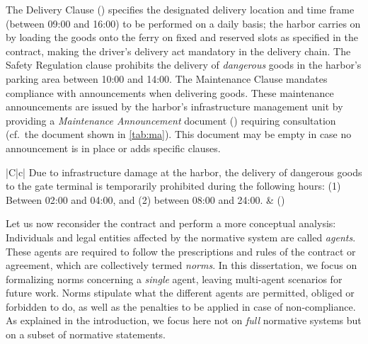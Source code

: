 The Delivery Clause (\DC) specifies the designated delivery location and time frame (between 09:00 and 16:00)  to be performed on a daily basis; the harbor carries on by loading the goods onto the ferry on fixed and reserved slots as specified in the contract, making the driver's delivery act mandatory in the delivery chain. The Safety Regulation clause \SR prohibits the delivery of \emph{dangerous} goods in the harbor's parking area between 10:00 and 14:00. The Maintenance Clause \MC mandates compliance with announcements when delivering goods. These maintenance announcements are issued by the harbor's infrastructure management unit by providing a \emph{Maintenance Announcement} document (\MA) requiring consultation (cf.~the document shown in \ref{tab:ma}). This document may be empty in case no announcement is in place or adds specific clauses. 


\begin{table}
    \centering
    \begin{tabular}{|C|c|}
    \hline
    Due to infrastructure damage at the harbor, the delivery of dangerous goods to the gate terminal is temporarily prohibited during the following hours: (1) Between 02:00 and 04:00, and (2) between 08:00 and 24:00. & (\MA)\\
    \hline
    \end{tabular}
    \caption{Maintenance Announcement}
    \label{tab:ma}
\end{table}


Let us now reconsider the contract and perform a more conceptual analysis: 
Individuals and legal entities affected by the normative system are called \emph{agents}. These agents are required to follow the prescriptions and rules of the contract or agreement, which are collectively termed \emph{norms}. In this dissertation, we focus on formalizing norms concerning a \emph{single} agent, leaving multi-agent scenarios for future work. 
Norms stipulate what the different agents are permitted, obliged or forbidden to do, as well as the penalties to be applied in case of non-compliance. As explained in the introduction, we focus here not on \emph{full} normative systems but on a subset of normative statements.

